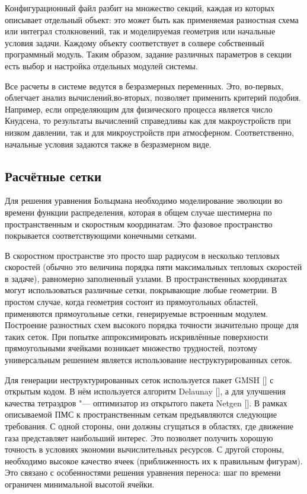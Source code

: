 Конфигурационный файл разбит на множество секций, каждая из которых описывает отдельный объект:
это может быть как применяемая разностная схема или интеграл столкновений, так и моделируемая геометрия или начальные условия задачи.
Каждому объекту соответствует в солвере собственный программный модуль.
Таким образом, задание различных параметров в секции есть выбор и настройка отдельных модулей системы.
 
Все расчеты в системе ведутся в безразмерных переменных.
Это, во-первых, облегчает анализ вычислений,во-вторых, позволяет применить критерий подобия.
Например, если определяющим для физического процесса является число Кнудсена, то результаты вычислений справедливы
как для макроустройств при низком давлении, так и для микроустройств при атмосферном.
Соответственно, начальные условия задаются также в безразмерном виде.

\subsection{Расчётные сетки}
Для решения уравнения Больцмана необходимо моделирование эволюции во времени функции распределения,
которая в общем случае шестимерна по пространственным и скоростным координатам.
Это фазовое пространство покрывается соответствующими конечными сетками.

В скоростном пространстве это просто шар радиусом в несколько тепловых скоростей
(обычно это величина порядка пяти максимальных тепловых скоростей в задаче), равномерно заполненный узлами.
В пространственных координатах могут использоваться различные сетки, покрывающие любые геометрии.
В простом случае, когда геометрия состоит из прямоугольных областей, применяются прямоугольные сетки, генерируемые встроенным модулем.
Построение разностных схем высокого порядка точности значительно проще для таких сеток.
При попытке аппроксимировать искривлённые поверхности прямоугольными ячейками возникает множество трудностей,
поэтому универсальным решением является использование неструктурированных сеток.

Для генерации неструктурированных сеток используется пакет GMSH [] с открытым кодом.
В нём используется алгоритм Delaunay [], а для улучшения качества тетраэдров "--- оптимизатор из открытого пакета Netgen [].
В рамках описываемой ПМС к пространственным сеткам предъявляются следующие требования.
С одной стороны, они должны сгущаться в областях, где движение газа представляет наибольший интерес.
Это позволяет получить хорошую точность в условиях экономии вычислительных ресурсов.
С другой стороны, необходимо высокое качество ячеек (приближенность их к правильным фигурам).
Это связано с особенностями решения уравнения переноса: шаг по времени ограничен минимальной высотой ячейки.

